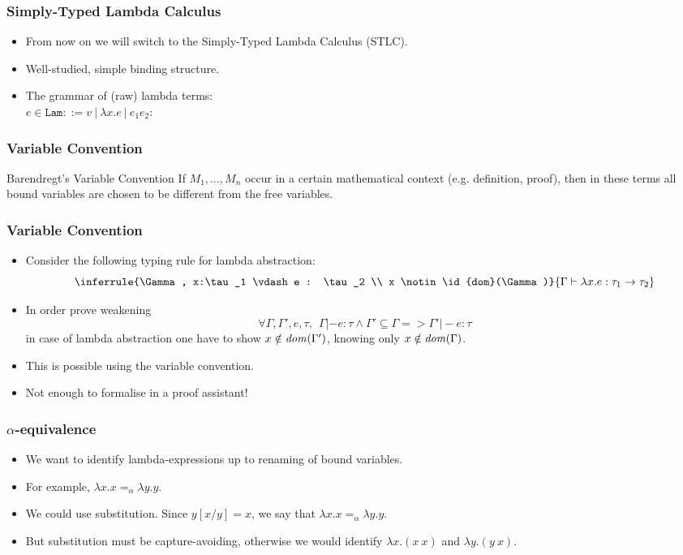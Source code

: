 \documentclass[10pt]{beamer}
\begin{document}
\begin{frame}
  \frametitle{Simply-Typed Lambda Calculus}
  \begin{itemize}
  \item From now on we will switch to the Simply-Typed Lambda Calculus (STLC).
  \item Well-studied, simple binding structure.
  \item The grammar of (raw) lambda terms:\\
    $e \in \texttt{Lam}  ::= v ~|~ \lambda x.e ~|~ e_1 e_2$:
  \end{itemize}
\end{frame}

\begin{frame}
  \frametitle{Variable Convention}
  \begin{exampleblock}{Barendregt's Variable Convention}
     \large{If $M_1,\dots, M_n$ occur in a certain mathematical context
     (e.g. definition, proof), then in these terms all bound
     variables are chosen to be different from the free variables.}
  \end{exampleblock}
\end{frame}

\begin{frame}
  \frametitle{Variable Convention}
  \begin{itemize}
  \item Consider the following typing rule for lambda abstraction:
    \[ \inferrule{\Gamma, x:\tau_1 \vdash e : \tau_2 \\ x \notin \id{dom}(\Gamma)}
              {\Gamma \vdash \lambda x.e : \tau_1 -> \tau_2} \]
  \item In order prove weakening
    \[\forall \Gamma, \Gamma', e, \tau,~~\Gamma |- e : \tau
    \land \Gamma' \subseteq \Gamma => \Gamma' |- e : \tau\]
  in case of lambda abstraction one have to show
  $x \notin \mathit{dom}(\Gamma')$, knowing only $x \notin \mathit{dom}(\Gamma)$.
\item This is possible using the variable convention.
\item Not enough to formalise in a proof assistant!
  \end{itemize}
\end{frame}

\begin{frame}
  \frametitle{$\alpha$-equivalence}
  \begin{itemize}
  \item We want to identify lambda-expressions up to renaming
    of bound variables.
  \item For example, $\lambda x.x =_\alpha \lambda y.y$.
  \item We could use substitution. Since $y[x/y] = x$, we say that
    $\lambda x.x =_\alpha \lambda y.y$.
  \item But substitution must be capture-avoiding, otherwise we would identify
    $\lambda x.(x~x)$ and $\lambda y.(y~x)$.
  \end{itemize}
\end{frame}
\end{document}
